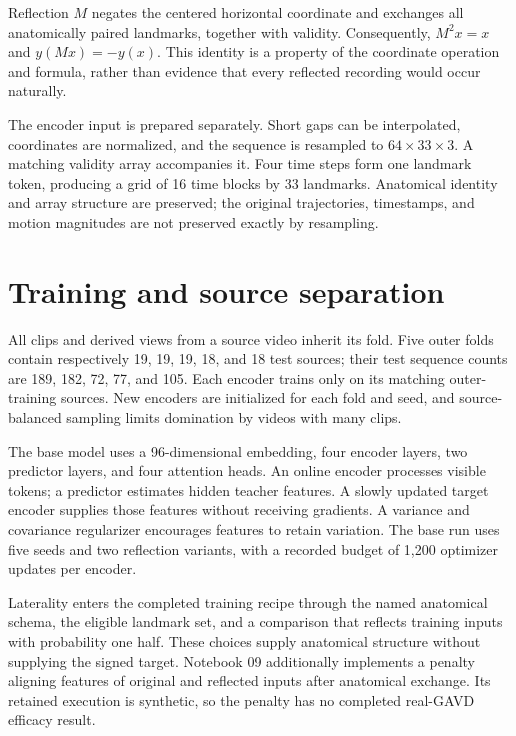 \documentclass{article}
\begin{document}
Reflection \(M\) negates the centered horizontal coordinate and exchanges all anatomically paired landmarks, together with validity. Consequently, \(M^2x=x\) and \(y(Mx)=-y(x)\). This identity is a property of the coordinate operation and formula, rather than evidence that every reflected recording would occur naturally.

The encoder input is prepared separately. Short gaps can be interpolated, coordinates are normalized, and the sequence is resampled to \(64\times33\times3\). A matching validity array accompanies it. Four time steps form one landmark token, producing a grid of 16 time blocks by 33 landmarks. Anatomical identity and array structure are preserved; the original trajectories, timestamps, and motion magnitudes are not preserved exactly by resampling.

\section{Training and source separation}\label{training-and-source-separation}

All clips and derived views from a source video inherit its fold. Five outer folds contain respectively 19, 19, 19, 18, and 18 test sources; their test sequence counts are 189, 182, 72, 77, and 105. Each encoder trains only on its matching outer-training sources. New encoders are initialized for each fold and seed, and source-balanced sampling limits domination by videos with many clips.

The base model uses a 96-dimensional embedding, four encoder layers, two predictor layers, and four attention heads. An online encoder processes visible tokens; a predictor estimates hidden teacher features. A slowly updated target encoder supplies those features without receiving gradients. A variance and covariance regularizer encourages features to retain variation. The base run uses five seeds and two reflection variants, with a recorded budget of 1,200 optimizer updates per encoder.

Laterality enters the completed training recipe through the named anatomical schema, the eligible landmark set, and a comparison that reflects training inputs with probability one half. These choices supply anatomical structure without supplying the signed target. Notebook 09 additionally implements a penalty aligning features of original and reflected inputs after anatomical exchange. Its retained execution is synthetic, so the penalty has no completed real-GAVD efficacy result.
\end{document}
